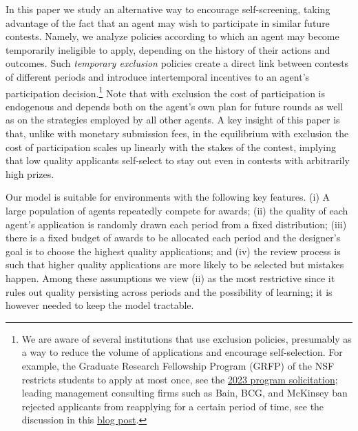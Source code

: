 \documentclass[12pt]{article}
\theoremstyle{plain}
\theoremstyle{definition}
\theoremstyle{remark}
\begin{document}
In this paper we study an alternative way to encourage self-screening, taking advantage of the fact that an agent may wish to participate in similar future contests. Namely, we analyze policies according to which an agent may become temporarily ineligible to apply, depending on the history of their actions and outcomes. Such \emph{temporary exclusion} policies create a direct link between contests of different periods and introduce intertemporal incentives to an agent's participation decision.\footnote{We are aware of several institutions that use exclusion policies, presumably as a way to reduce the volume of applications and encourage self-selection. For example, the Graduate Research Fellowship Program (GRFP) of the NSF restricts students to apply at most once, see the \href{https://www.nsf.gov/pubs/2023/nsf23605/nsf23605.pdf}{2023 program solicitation}; leading management consulting firms such as Bain, BCG, and McKinsey ban rejected applicants from reapplying for a certain period of time, see the discussion in this \href{https://strategycase.com/ban-period-in-consulting-applications}{blog post}.}  Note that with exclusion the cost of participation is endogenous and depends both on the agent's own plan for future rounds as well as on the strategies employed by all other agents. A key insight of this paper is that, unlike with monetary submission fees, in the equilibrium with exclusion the cost of participation scales up linearly with the stakes of the contest, implying that low quality applicants self-select to stay out even in contests with arbitrarily high prizes. 


Our model is suitable for environments with the following key features. (i) A large population of agents repeatedly compete for awards; (ii) the quality of each agent's application is randomly drawn each period from a fixed distribution; (iii) there is a fixed budget of awards to be allocated each period and the designer's goal is to choose the highest quality applications; and (iv) the review process is such that higher quality applications are more likely to be selected but mistakes happen. Among these assumptions we view (ii) as the most restrictive since it rules out quality persisting across periods and the possibility of learning; it is however needed to keep the model tractable. %
\end{document}
